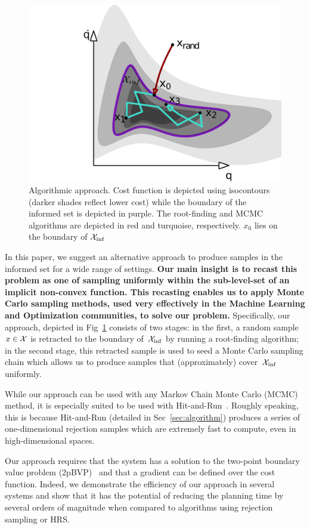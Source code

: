 \documentclass[letterpaper, 10 pt, conference]{ieeeconf}  %
\begin{document}
\begin{figure}[tb]
  \centering
  	\includegraphics[width=0.75\linewidth ]{fig/alg.pdf}
  \caption{
    \captionstyle
  	Algorithmic approach.
  	Cost function is depicted using isocontours (darker shades reflect lower cost) while the boundary of the informed set is depicted in purple. 
  	The root-finding and MCMC algorithms are depicted in red and turquoise, respectively.
  	$ x_0 $ lies on the boundary of $ \mathcal{X}_{\rm {inf}} $
  	}
   	\label{fig:alg}
\end{figure}


In this paper, we suggest an alternative approach to produce samples in the informed set \Cinf for a wide range of settings.
\textbf{
Our main insight is to recast this problem as one of sampling uniformly within the sub-level-set of an implicit non-convex function.
This recasting enables us to apply Monte Carlo sampling methods, used very effectively in the Machine Learning and Optimization communities, to solve our problem.
}
Specifically, our approach, depicted in Fig~\ref{fig:alg} consists of two stages:
in the first, a random sample $x \in \mathcal{X}$ is retracted to the boundary of~$\mathcal{X}_{\rm {inf}}$ by running a root-finding algorithm;
in the second stage, this retracted sample  is used to seed a Monte Carlo sampling chain which allows us to  produce samples that (approximately) cover~$\mathcal{X}_{\rm {inf}}$  uniformly.

While our approach can be used with any Markov Chain Monte Carlo (MCMC) method, it is especially suited to be used with Hit-and-Run~\cite{KSZ11}.
Roughly speaking, this is because Hit-and-Run (detailed in Sec~\ref{sec:algorithm})
produces a series of one-dimensional rejection samples which are extremely fast to compute, even in high-dimensional spaces. 

Our approach requires that the system has a solution to the two-point boundary value problem (2pBVP)~\cite{L06} and that a gradient can be defined over the cost function.
Indeed, we demonstrate the efficiency of our approach in several systems and show that it has the potential of reducing the planning time by several orders of magnitude when compared to algorithms using rejection sampling or HRS.
\end{document}
